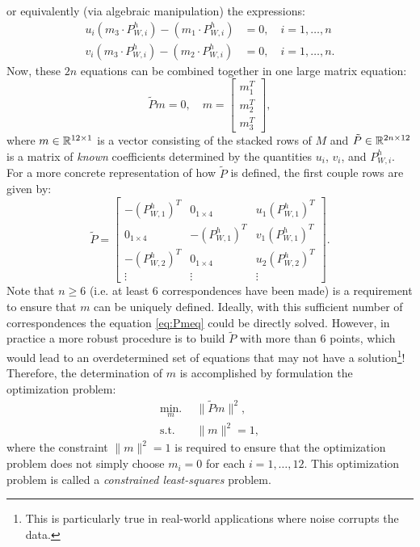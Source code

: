 or equivalently (via algebraic manipulation) the expressions:
\begin{equation}
\begin{split}
    u_i(m_3 \cdot P_{W,i}^h) - (m_1 \cdot P_{W,i}^h) &= 0, \quad i = 1,\dots,n \\
    v_i(m_3 \cdot P_{W,i}^h) - (m_2 \cdot P_{W,i}^h) &= 0, \quad i = 1,\dots,n.
\end{split}
\end{equation}
Now, these $2n$ equations can be combined together in one large matrix equation:
\begin{equation}
    \tilde{P}m = 0, \quad m = \begin{bmatrix}
        m_1^T \\ m_2^T \\ m_3^T
    \end{bmatrix},
\end{equation}
where $m \in \mathbb{R}^{12 \times 1}$ is a vector consisting of the stacked rows of $M$ and $\tilde{P} \in \mathbb{R}^{2n \times 12}$ is a matrix of \textit{known} coefficients determined by the quantities $u_i$, $v_i$, and $P^h_{W,i}$. For a more concrete representation of how $\tilde{P}$ is defined, the first couple rows are given by:
\begin{equation} \label{eq:Pmeq}
\tilde{P} =
     \begin{bmatrix}
  -(P_{W,1}^h)^T & 0_{1\times 4} & u_{1} (P_{W,1}^h)^T \\
  0_{1 \times 4} & -(P_{W,1}^h)^T & v_{1} (P_{W,1}^h)^T  \\
  -(P_{W,2}^h)^T & 0_{1\times 4} & u_{2} (P_{W,2}^h)^T \\
  \vdots & \vdots & \vdots
 \end{bmatrix}.
\end{equation}
Note that $n \geq 6$ (i.e. at least 6 correspondences have been made) is a requirement to ensure that $m$ can be uniquely defined. Ideally, with this sufficient number of correspondences the equation \eqref{eq:Pmeq} could be directly solved. However, in practice a more robust procedure is to build $\tilde{P}$ with more than 6 points, which would lead to an overdetermined set of equations that may not have a solution\footnote{This is particularly true in real-world applications where noise corrupts the data.}! 
Therefore, the determination of $m$ is accomplished by formulation the optimization problem:
\begin{equation} \label{eq:mopt}
\begin{split}
\underset{m}{\text{min.}} \:\:& \lVert \tilde{P} m \rVert^2, \\
    \text{s.t.}\:\:& \lVert m \rVert^2 = 1,
\end{split}
\end{equation}
where the constraint $\lVert m \rVert^2 = 1$ is required to ensure that the optimization problem does not simply choose $m_i=0$ for each $i = 1,\dots,12$. This optimization problem is called a \textit{constrained least-squares} problem.

